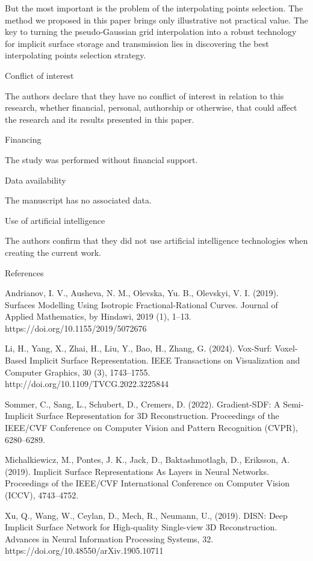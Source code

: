 \documentclass[12pt,a4paper]{article}
\begin{document}
\par
But the most important is the problem of the interpolating points selection. The method we proposed in this paper brings only illustrative not practical value. The key to turning the pseudo-Gaussian grid interpolation into a robust technology for implicit surface storage and transmission lies in discovering the best interpolating points selection strategy.
\par
Conflict of interest
\par
The authors declare that they have no conflict of interest in relation to this research, whether financial, personal, authorship or otherwise, that could affect the research and its results presented in this paper.
\par
Financing
\par
The study was performed without financial support.
\par
Data availability
\par
The manuscript has no associated data.
\par
Use of artificial intelligence
\par
The authors confirm that they did not use artificial intelligence technologies when creating the current work.
\par
References
\par
Andrianov, I. V., Ausheva, N. M., Olevska, Yu. B., Olevskyi, V. I. (2019). Surfaces Modelling Using Isotropic Fractional-Rational Curves. Journal of Applied Mathematics, by Hindawi, 2019 (1), 1–13. https://doi.org/10.1155/2019/5072676
\par
Li, H., Yang, X., Zhai, H., Liu, Y., Bao, H., Zhang, G. (2024). Vox-Surf: Voxel-Based Implicit Surface Representation. IEEE Transactions on Visualization and Computer Graphics, 30 (3), 1743–1755. http://doi.org/10.1109/TVCG.2022.3225844
\par
Sommer, C., Sang, L., Schubert, D., Cremers, D. (2022). Gradient-SDF: A Semi-Implicit Surface Representation for 3D Reconstruction. Proceedings of the IEEE/CVF Conference on Computer Vision and Pattern Recognition (CVPR), 6280–6289.
\par
Michalkiewicz, M., Pontes, J. K., Jack, D., Baktashmotlagh, D., Eriksson, A. (2019). Implicit Surface Representations As Layers in Neural Networks. Proceedings of the IEEE/CVF International Conference on Computer Vision (ICCV), 4743–4752.
\par
Xu, Q., Wang, W., Ceylan, D., Mech, R., Neumann, U., (2019). DISN: Deep Implicit Surface Network for High-quality Single-view 3D Reconstruction. Advances in Neural Information Processing Systems, 32. https://doi.org/10.48550/arXiv.1905.10711
\end{document}

